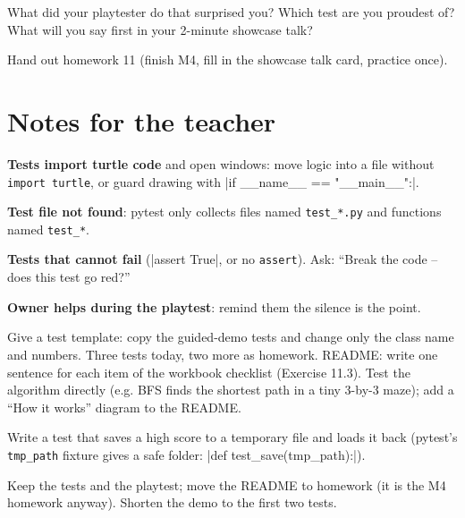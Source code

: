 \begin{reflection}
What did your playtester do that surprised you? Which test are you proudest of? What will you say first in your 2-minute showcase talk?
\end{reflection}

Hand out homework 11 (finish M4, fill in the showcase talk card, practice once).

\section{Notes for the teacher}
\begin{commonmistakes}
  \item \textbf{Tests import turtle code} and open windows: move logic into a file without \texttt{import turtle}, or guard drawing with \py|if __name__ == "__main__":|.
  \item \textbf{Test file not found}: pytest only collects files named \texttt{test\_*.py} and functions named \texttt{test\_*}.
  \item \textbf{Tests that cannot fail} (\py|assert True|, or no \texttt{assert}). Ask: \enquote{Break the code -- does this test go red?}
  \item \textbf{Owner helps during the playtest}: remind them the silence is the point.
\end{commonmistakes}

\begin{differentiation}
\supportpath Give a test template: copy the guided-demo tests and change only the class name and numbers. Three tests today, two more as homework. README: write one sentence for each item of the workbook checklist (Exercise 11.3).
\extensionpath Test the algorithm directly (e.g. BFS finds the shortest path in a tiny 3-by-3 maze); add a \enquote{How it works} diagram to the README.
\end{differentiation}

\begin{stretchchallenge}
Write a test that saves a high score to a temporary file and loads it back (pytest's \texttt{tmp\_path} fixture gives a safe folder: \py|def test_save(tmp_path):|).
\end{stretchchallenge}

\begin{teachernote}
Keep the tests and the playtest; move the README to homework (it is the M4 homework anyway). Shorten the demo to the first two tests.
\end{teachernote}
